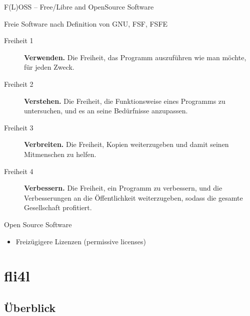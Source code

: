 \documentclass[t]{beamer}
\makeatletter
\newcommand{\strong}[1]{\@strong{#1}}
\newcommand{\@@strong}[1]{\textbf{\let\@strong\@@@strong#1}}
\newcommand{\@@@strong}[1]{\textnormal{\let\@strong\@@strong#1}}
\let\@strong\@@strong
\makeatother
\begin{document}
\begin{frame}{F(L)OSS -- Free/Libre and OpenSource Software}
    \begin{block}{Freie Software nach Definition von GNU, FSF, FSFE}
        \begin{description}
            \item[Freiheit 1] \strong{Verwenden.} {\small Die Freiheit,
                das Programm auszuführen wie man möchte, für jeden
                Zweck.}
            \item[Freiheit 2] \strong{Verstehen.} {\small Die Freiheit,
                die Funktionsweise eines Programms zu untersuchen, und
                es an seine Bedürfnisse anzupassen.}
            \item[Freiheit 3] \strong{Verbreiten.} {\small Die Freiheit,
                Kopien weiterzugeben und damit seinen Mitmenschen zu
                helfen.}
            \item[Freiheit 4] \strong{Verbessern.} {\small Die Freiheit,
                ein Programm zu verbessern, und die Verbesserungen
                an die Öffentlichkeit weiterzugeben, sodass die
                gesamte Gesellschaft profitiert.}
        \end{description}
    \end{block}
    \pause
    \begin{block}{Open Source Software}
        \begin{itemize}
            \item Freizügigere Lizenzen (permissive licenses)
        \end{itemize}
    \end{block}
\end{frame}

\section{fli4l}

\subsection{Überblick}
\end{document}
